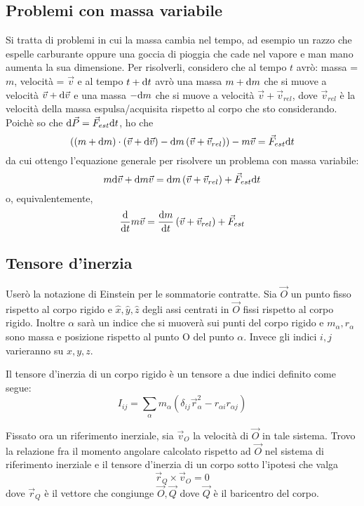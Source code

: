 \documentclass[../main.tex]{subfiles}
\begin{document}
\subsection{Problemi con massa variabile}
Si tratta di problemi in cui la massa cambia nel tempo, ad esempio un razzo che espelle carburante oppure una goccia di pioggia che cade nel vapore e man mano aumenta la sua dimensione.
Per risolverli, considero che al tempo $t$ avrò:
massa = $m$, velocità = $\vec v$
e al tempo $t+\mathrm{d} t$ avrò una massa $m+\mathrm{d} m$ che si muove a velocità $\vec v + \mathrm{d} \vec v$ e una massa $-\mathrm{d} m$ che si muove a velocità $\vec v + \vec v_{rel}$, dove $\vec v_{rel}$ è la velocità della massa espulsa/acquisita rispetto al corpo che sto considerando.
Poichè so che $\mathrm{d} \vec P = \vec F_{est} \mathrm{d} t$, ho che
$$ \left ( \left ( m + \mathrm{d} m \right ) \cdot \left ( \vec v + \mathrm{d} \vec v\right ) -\mathrm{d} m\left ( \vec v + \vec v_{rel} \right ) \right ) - m\vec v = \vec F_{est}\mathrm{d} t$$
da cui ottengo l'equazione generale per risolvere un problema con massa variabile:
\begin{equation}\label{MassaVariabile}
	m \mathrm{d} \vec v + \mathrm{d} m \vec v = \mathrm{d} m \left ( \vec v + \vec v_{rel} \right ) + \vec F_{est} \mathrm{d} t
\end{equation}
o, equivalentemente,
\begin{equation}
	\frac{\mathrm{d} }{\mathrm{d} t} m\vec v = \frac{\mathrm{d} m}{\mathrm{d} t}\left ( \vec v + \vec v_{rel} \right ) + \vec F_{est}
\end{equation}



\subsection{Tensore d'inerzia} \label{ten}
Userò la notazione di Einstein per le sommatorie contratte.
Sia $\vec O$ un punto fisso rispetto al corpo rigido e $\hat x,\hat y,\hat z$ degli assi centrati in $\vec O$ fissi rispetto al corpo rigido.
Inoltre $\alpha$ sarà un indice che si muoverà sui punti del corpo rigido e $m_\alpha,r_\alpha$ sono massa e posizione rispetto al punto O del punto $\alpha$. Invece gli indici $i,j$ varieranno su $x,y,z$.

Il tensore d'inerzia di un corpo rigido è un tensore a due indici definito come segue:
\begin{equation} \label{ten:definizione}
	I_{ij}=\sum_\alpha m_\alpha(\delta_{ij}\vec r_{\alpha}^2 -r_{\alpha i}r_{\alpha j})
\end{equation}

Fissato ora un riferimento inerziale, sia $\vec v_O$ la velocità di $\vec O$ in tale sistema. 
Trovo la relazione fra il momento angolare calcolato rispetto ad $\vec O$ nel sistema di riferimento inerziale e il tensore d'inerzia di un corpo sotto l'ipotesi che valga
\begin{equation} \label{ten:CondizioneSulCentro}
	\vec r_Q\times \vec v_O=0
\end{equation}
dove $\vec r_Q$ è il vettore che congiunge $\vec O,\vec Q$ dove $\vec Q$ è il baricentro del corpo.
\end{document}
